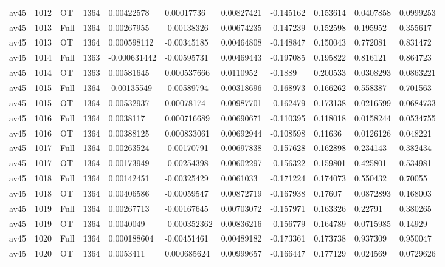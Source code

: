 \begin{landscape}
\begin{longtable}{lllllllllll}
av45 & 1012 & OT & 1364 & 0.00422578 & 0.00017736 & 0.00827421 & -0.145162 & 0.153614 & 0.0407858 & 0.0999253 \\
av45 & 1013 & Full & 1364 & 0.00267955 & -0.00138326 & 0.00674235 & -0.147239 & 0.152598 & 0.195952 & 0.355617 \\
av45 & 1013 & OT & 1364 & 0.000598112 & -0.00345185 & 0.00464808 & -0.148847 & 0.150043 & 0.772081 & 0.831472 \\
av45 & 1014 & Full & 1363 & -0.000631442 & -0.00595731 & 0.00469443 & -0.197085 & 0.195822 & 0.816121 & 0.864723 \\
av45 & 1014 & OT & 1363 & 0.00581645 & 0.000537666 & 0.0110952 & -0.1889 & 0.200533 & 0.0308293 & 0.0863221 \\
av45 & 1015 & Full & 1364 & -0.00135549 & -0.00589794 & 0.00318696 & -0.168973 & 0.166262 & 0.558387 & 0.701563 \\
av45 & 1015 & OT & 1364 & 0.00532937 & 0.00078174 & 0.00987701 & -0.162479 & 0.173138 & 0.0216599 & 0.0684733 \\
av45 & 1016 & Full & 1364 & 0.0038117 & 0.000716689 & 0.00690671 & -0.110395 & 0.118018 & 0.0158244 & 0.0534755 \\
av45 & 1016 & OT & 1364 & 0.00388125 & 0.000833061 & 0.00692944 & -0.108598 & 0.11636 & 0.0126126 & 0.048221 \\
av45 & 1017 & Full & 1364 & 0.00263524 & -0.00170791 & 0.00697838 & -0.157628 & 0.162898 & 0.234143 & 0.382434 \\
av45 & 1017 & OT & 1364 & 0.00173949 & -0.00254398 & 0.00602297 & -0.156322 & 0.159801 & 0.425801 & 0.534981 \\
av45 & 1018 & Full & 1364 & 0.00142451 & -0.00325429 & 0.0061033 & -0.171224 & 0.174073 & 0.550432 & 0.70055 \\
av45 & 1018 & OT & 1364 & 0.00406586 & -0.00059547 & 0.00872719 & -0.167938 & 0.17607 & 0.0872893 & 0.168003 \\
av45 & 1019 & Full & 1364 & 0.00267713 & -0.00167645 & 0.00703072 & -0.157971 & 0.163326 & 0.22791 & 0.380265 \\
av45 & 1019 & OT & 1364 & 0.0040049 & -0.000352362 & 0.00836216 & -0.156779 & 0.164789 & 0.0715985 & 0.14929 \\
av45 & 1020 & Full & 1364 & 0.000188604 & -0.00451461 & 0.00489182 & -0.173361 & 0.173738 & 0.937309 & 0.950047 \\
av45 & 1020 & OT & 1364 & 0.0053411 & 0.000685624 & 0.00999657 & -0.166447 & 0.177129 & 0.024569 & 0.0729626 \\

\end{longtable}
\end{landscape}
